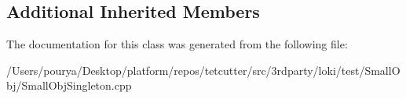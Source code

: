 \subsection*{Additional Inherited Members}


The documentation for this class was generated from the following file\+:\begin{DoxyCompactItemize}
\item 
/\+Users/pourya/\+Desktop/platform/repos/tetcutter/src/3rdparty/loki/test/\+Small\+Obj/Small\+Obj\+Singleton.\+cpp\end{DoxyCompactItemize}
